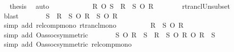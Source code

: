 \begin{isabellebody}
\ \isamarkupfalse%
\ {\isacharquery}{\kern0pt}thesis\ \isamarkupfalse%
\ auto\isanewline
\ \ \ \ \isamarkupfalse%
\isanewline
\ \ \ \ \isamarkupfalse%
\ \isamarkupfalse%
\ {\isachardoublequoteopen}R\ O\ S\isactrlsup {\isacharasterisk}{\kern0pt}\ {\isasymsubseteq}\ {\isacharparenleft}{\kern0pt}R\ {\isasymunion}\ S{\isacharparenright}{\kern0pt}\isactrlsup {\isacharasterisk}{\kern0pt}\ O\ R{\isachardoublequoteclose}\isanewline
\ \ \ \ \ \ \isamarkupfalse%
\ rtrancl{\isacharunderscore}{\kern0pt}Un{\isacharunderscore}{\kern0pt}subset\ \isamarkupfalse%
\ blast\isanewline
\ \ \ \ \isamarkupfalse%
\ \isamarkupfalse%
\ {\isachardoublequoteopen}{\isacharquery}{\kern0pt}S\ {\isasymsubseteq}\ {\isacharparenleft}{\kern0pt}R\ {\isasymunion}\ S{\isacharparenright}{\kern0pt}\isactrlsup {\isacharasterisk}{\kern0pt}\ O\ {\isacharparenleft}{\kern0pt}R\ {\isasymunion}\ S{\isacharparenright}{\kern0pt}\isactrlsup {\isacharasterisk}{\kern0pt}\ O\ R{\isachardoublequoteclose}\isanewline
\ \ \ \ \ \ \isamarkupfalse%
\ {\isacharparenleft}{\kern0pt}simp\ add{\isacharcolon}{\kern0pt}\ relcomp{\isacharunderscore}{\kern0pt}mono\ rtrancl{\isacharunderscore}{\kern0pt}mono{\isacharparenright}{\kern0pt}\isanewline
\ \ \ \ \isamarkupfalse%
\ \isamarkupfalse%
\ {\isachardoublequoteopen}{\isasymdots}\ {\isacharequal}{\kern0pt}\ {\isacharparenleft}{\kern0pt}R\ {\isasymunion}\ S{\isacharparenright}{\kern0pt}\isactrlsup {\isacharasterisk}{\kern0pt}\ O\ R{\isachardoublequoteclose}\isanewline
\ \ \ \ \ \ \isamarkupfalse%
\ {\isacharparenleft}{\kern0pt}simp\ add{\isacharcolon}{\kern0pt}\ O{\isacharunderscore}{\kern0pt}assoc{\isacharbrackleft}{\kern0pt}symmetric{\isacharbrackright}{\kern0pt}{\isacharparenright}{\kern0pt}\isanewline
\ \ \ \ \isamarkupfalse%
\ \isamarkupfalse%
\ {\isachardoublequoteopen}{\isacharquery}{\kern0pt}S\ O\ {\isacharparenleft}{\kern0pt}R\ {\isasymunion}\ S{\isacharparenright}{\kern0pt}\isactrlsup {\isacharasterisk}{\kern0pt}\ {\isasymsubseteq}\ {\isacharparenleft}{\kern0pt}R\ {\isasymunion}\ S{\isacharparenright}{\kern0pt}\isactrlsup {\isacharasterisk}{\kern0pt}\ O\ R\ O\ {\isacharparenleft}{\kern0pt}R\ {\isasymunion}\ S{\isacharparenright}{\kern0pt}\isactrlsup {\isacharasterisk}{\kern0pt}{\isachardoublequoteclose}\isanewline
\ \ \ \ \ \ \isamarkupfalse%
\ {\isacharparenleft}{\kern0pt}simp\ add{\isacharcolon}{\kern0pt}\ O{\isacharunderscore}{\kern0pt}assoc{\isacharbrackleft}{\kern0pt}symmetric{\isacharbrackright}{\kern0pt}\ relcomp{\isacharunderscore}{\kern0pt}mono{\isacharparenright}{\kern0pt}\isanewline

\end{isabellebody}

